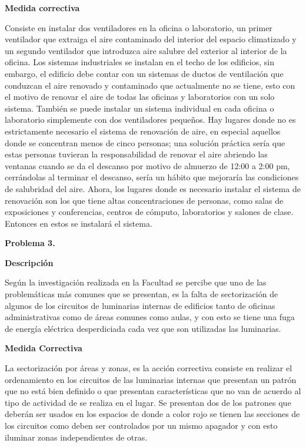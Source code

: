 \documentclass[12pt,letterpaper]{report}
\begin{document}
\textbf{Medida correctiva}

Consiste en instalar dos ventiladores en la oficina o laboratorio, un primer ventilador que extraiga el aire contaminado del interior del espacio climatizado y un segundo ventilador que introduzca aire salubre del exterior al interior de la oficina. Los sistemas industriales se instalan en el techo de los edificios, sin embargo, el edificio debe contar con un sistemas de ductos de ventilación que conduzcan el aire renovado y contaminado que actualmente no se tiene, esto con el motivo de renovar el aire de todas las oficinas y laboratorios con un solo sistema. También se puede instalar un sistema individual en cada oficina o laboratorio simplemente con dos ventiladores pequeños.
Hay lugares donde no es estrictamente necesario el sistema de renovación de aire, en especial aquellos donde se concentran menos de cinco personas; una solución práctica sería que estas personas tuvieran la responsabilidad de renovar el aire abriendo las ventanas cuando se da el descanso por motivo de almuerzo de 12:00 a 2:00 pm, cerrándolas al terminar el descanso, sería un hábito que mejoraría las condiciones de salubridad del aire. Ahora, los lugares donde es necesario instalar el sistema de renovación son los que tiene altas concentraciones de personas, como salas de exposiciones y conferencias, centros de cómputo, laboratorios  y salones de clase. Entonces en estos se instalará el sistema.

\textbf{Problema 3.}

\textbf{Descripción}

Según la investigación realizada en la Facultad se percibe que uno de las problemáticas más comunes que se presentan, es la falta de sectorización de algunos de los circuitos de luminarias internas de edificios tanto de oficinas administrativas como de áreas comunes como aulas, y con esto se tiene una fuga de energía eléctrica desperdiciada cada vez que son utilizadas las luminarias.

\textbf{Medida Correctiva}

La sectorización por áreas y zonas, es la acción correctiva consiste en realizar el ordenamiento en los circuitos de las luminarias internas que presentan un patrón que no está bien definido o que presentan características que no van de acuerdo al tipo de actividad de se realiza en el lugar. Se presentan dos de los patrones que deberán ser usados en los espacios de donde a color rojo se tienen las secciones de los circuitos como deben ser controlados por un mismo apagador y con esto iluminar zonas independientes de otras.
\end{document}
